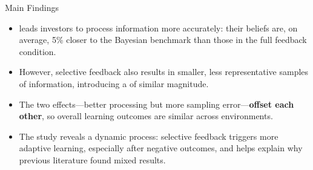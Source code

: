 \begin{frame}{Main Findings}
    \begin{itemize}
      \item {} leads investors to process information more accurately: their beliefs are, on average, 5\% closer to the Bayesian benchmark than those in the full feedback condition.
      
      \medskip
      \item However, selective feedback also results in smaller, less representative samples of information, introducing a  of similar magnitude.
      
      \medskip
      \item The two effects—better processing but more sampling error—\textbf{offset each other}, so overall learning outcomes are similar across environments.
      
      \medskip
      \item The study reveals a dynamic process: selective feedback triggers more adaptive learning, especially after negative outcomes, and helps explain why previous literature found mixed results.
    \end{itemize}
\end{frame}